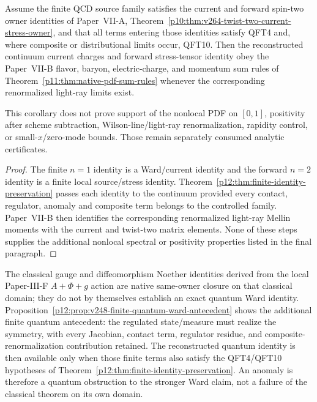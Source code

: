 \documentclass[12pt,a4paper]{article}
\begin{document}
\begin{corollary}
\label{p12:cor:v264-current-stress-pdf-sum-rule-transport}
Assume the finite QCD source family satisfies the current and forward spin-two
owner identities of Paper~VII-A, Theorem~\ref{p10:thm:v264-twist-two-current-stress-owner},
and that all terms entering those identities satisfy QFT4 and, where composite
or distributional limits occur, QFT10.  Then the reconstructed continuum
current charges and forward stress-tensor identity obey the Paper~VII-B
flavor, baryon, electric-charge, and momentum sum rules of
Theorem~\ref{p11:thm:native-pdf-sum-rules} whenever the corresponding
renormalized light-ray limits exist.

This corollary does not prove support of the nonlocal PDF on \([0,1]\),
positivity after scheme subtraction, Wilson-line/light-ray renormalization,
rapidity control, or small-\(x\)/zero-mode bounds.  Those remain separately
consumed analytic certificates.
\end{corollary}
\begin{proof}
The finite \(n=1\) identity is a Ward/current identity and the forward \(n=2\)
identity is a finite local source/stress identity.  Theorem~\ref{p12:thm:finite-identity-preservation}
passes each identity to the continuum provided every contact, regulator,
anomaly and composite term belongs to the controlled family.  Paper~VII-B
then identifies the corresponding renormalized light-ray Mellin moments with
the current and twist-two matrix elements.  None of these steps supplies the
additional nonlocal spectral or positivity properties listed in the final
paragraph.
\end{proof}


\begin{remark}
\label{p12:rem:v176-classical-noether-quantum-ward-firewall}
The classical gauge and diffeomorphism Noether identities derived from the
local Paper-III-F \(A+\Phi+g\) action are native same-owner closure on that
classical domain; they do not by themselves establish an exact quantum Ward
identity.  Proposition~\ref{p12:prop:v248-finite-quantum-ward-antecedent}
shows the additional finite quantum antecedent: the regulated state/measure
must realize the symmetry, with every Jacobian, contact term, regulator
residue, and composite-renormalization contribution retained.  The
reconstructed quantum identity is then available only when those finite terms
also satisfy the QFT4/QFT10 hypotheses of
Theorem~\ref{p12:thm:finite-identity-preservation}.  An anomaly is therefore a
quantum obstruction to the stronger Ward claim, not a failure of the
classical theorem on its own domain.
\end{remark}
\end{document}
